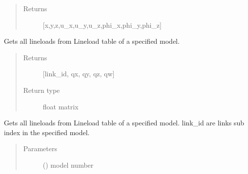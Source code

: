 \documentclass[letterpaper,10pt,english]{sphinxmanual}
\begin{document}
\begin{fulllineitems}
\begin{fulllineitems}
\begin{quote}
\begin{description}
\item[{Returns}] \leavevmode
{[}x,y,z,u\_x,u\_y,u\_z,phi\_x,phi\_y,phi\_z{]}

\end{description}\end{quote}

\end{fulllineitems}


\begin{fulllineitems}
\label{\detokenize{api:beamon.database.database.Database.get_all_lineloads}}
Gets all lineloads from Lineload table of a specified model.
\begin{quote}\begin{description}
\item[{Returns}] \leavevmode
{[}link\_id, qx, qy, qz, qw{]}

\item[{Return type}] \leavevmode
float matrix

\end{description}\end{quote}

\end{fulllineitems}


\begin{fulllineitems}
\label{\detokenize{api:beamon.database.database.Database.get_all_lineloads_for_simulation}}
Gets all lineloads from Lineload table of a specified model.
link\_id are links sub index in the specified model.
\begin{quote}\begin{description}
\item[{Parameters}] \leavevmode
{} () \textendash{} model number


\end{description}
\end{quote}
\end{fulllineitems}
\end{fulllineitems}
\end{document}
